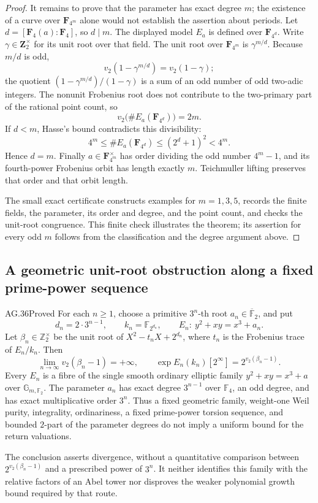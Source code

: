 \begin{proof}
It remains to prove that the parameter has exact degree $m$;
the existence of a curve over $\mathbf F_{4^m}$ alone would not
establish the assertion about periods. Let
$d=[\mathbf F_4(a):\mathbf F_4]$, so $d\mid m$. The displayed
model $E_a$ is defined over $\mathbf F_{4^d}$. Write
$\gamma\in\mathbf Z_2^\times$ for its unit root over that field.
The unit root over $\mathbf F_{4^m}$ is
$\gamma^{m/d}$. Because $m/d$ is odd,
\[
 v_2(1-\gamma^{m/d})=v_2(1-\gamma);
\]
the quotient $(1-\gamma^{m/d})/(1-\gamma)$ is a sum of an
odd number of odd two-adic integers. The nonunit Frobenius root
does not contribute to the two-primary part of the rational
point count, so
\[
             v_2\bigl(\#E_a(\mathbf F_{4^d})\bigr)=2m.
\]
If $d<m$, Hasse's bound contradicts this divisibility:
\[
 4^m\le\#E_a(\mathbf F_{4^d})
       \le(2^d+1)^2<4^m.
\]
Hence $d=m$. Finally $a\in\mathbf F_{4^m}^\times$ has order
dividing the odd number $4^m-1$, and its fourth-power Frobenius
orbit has length exactly $m$. Teichmuller lifting preserves that
order and that orbit length.

The small exact certificate
constructs examples for $m=1,3,5$, records the finite fields,
the parameter, its order and degree, and the point count, and
checks the unit-root congruence. This finite check illustrates
the theorem; its assertion for every odd $m$ follows from the
classification and the degree argument above.
\end{proof}

\subsection{A geometric unit-root obstruction along a fixed prime-power sequence}

\begin{claim}{AG.36}{Proved}\label{clm:AGfixedthreepower}
For each \(n\geq1\), choose a primitive \(3^n\)-th root
\(a_n\in\overline{\mathbb F}_2\), and put
\[
 d_n=2\cdot3^{n-1},\qquad k_n=\mathbb F_{2^{d_n}},\qquad
 E_n:\ y^2+xy=x^3+a_n.
 \tag{AG.36.1}
\]
Let \(\beta_n\in\mathbb Z_2^\times\) be the unit root of
\(X^2-t_nX+2^{d_n}\), where \(t_n\) is the Frobenius trace
of \(E_n/k_n\). Then
\[
 \lim_{n\to\infty}v_2(\beta_n-1)=+\infty,
 \qquad
 \exp E_n(k_n)[2^\infty]=2^{v_2(\beta_n-1)}.
 \tag{AG.36.2}
\]
Every \(E_n\) is a fibre of the single smooth ordinary elliptic
family \(y^2+xy=x^3+a\) over \(\mathbb G_{m,\mathbb F_2}\).
The parameter \(a_n\) has exact degree \(3^{n-1}\) over
\(\mathbb F_4\), an odd degree, and has exact multiplicative
order \(3^n\). Thus a fixed geometric family, weight-one Weil
purity, integrality, ordinariness, a fixed prime-power torsion
sequence, and bounded \(2\)-part of the parameter degrees do
not imply a uniform bound for the return valuations.

The conclusion asserts divergence, without a quantitative
comparison between \(2^{v_2(\beta_n-1)}\) and a prescribed
power of \(3^n\). It neither identifies this family with the
relative factors of an Abel tower nor disproves the weaker
polynomial growth bound required by that route.
\end{claim}

